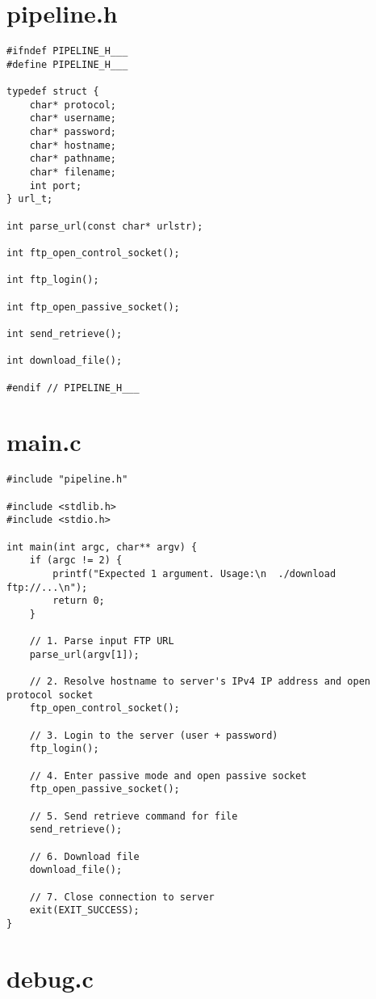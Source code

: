 \documentclass[subfiles]{main.tex}
\begin{document}
\section*{pipeline.h}

\begin{lstlisting}[style=C-sublime]
#ifndef PIPELINE_H___
#define PIPELINE_H___

typedef struct {
	char* protocol;
	char* username;
	char* password;
	char* hostname;
	char* pathname;
	char* filename;
	int port;
} url_t;

int parse_url(const char* urlstr);

int ftp_open_control_socket();

int ftp_login();

int ftp_open_passive_socket();

int send_retrieve();

int download_file();

#endif // PIPELINE_H___
\end{lstlisting}

\section*{main.c}

\begin{lstlisting}[style=C-sublime]
#include "pipeline.h"

#include <stdlib.h>
#include <stdio.h>

int main(int argc, char** argv) {
	if (argc != 2) {
		printf("Expected 1 argument. Usage:\n  ./download ftp://...\n");
		return 0;
	}
	
	// 1. Parse input FTP URL
	parse_url(argv[1]);
	
	// 2. Resolve hostname to server's IPv4 IP address and open protocol socket
	ftp_open_control_socket();
	
	// 3. Login to the server (user + password)
	ftp_login();
	
	// 4. Enter passive mode and open passive socket
	ftp_open_passive_socket();
	
	// 5. Send retrieve command for file
	send_retrieve();
	
	// 6. Download file
	download_file();
	
	// 7. Close connection to server
	exit(EXIT_SUCCESS);
}
\end{lstlisting}

\section*{debug.c}
\end{document}
